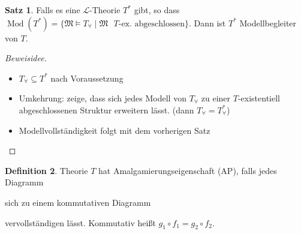 \documentclass[12pt,parskip=full]{scrartcl}
\theoremstyle{definition}
\newtheorem{theorem}{Satz}[section]
\newtheorem{definition}[theorem]{Definition}
\begin{document}
 	\begin{theorem}
 		Falls es eine $\mathcal{L}$-Theorie $T^*$ gibt, so dass $\operatorname{Mod}(T^*) = \{ \mathfrak{M} \models T_\forall \mid \mathfrak{M} \text{ $T$-ex. abgeschlossen} \}$. Dann ist $T^*$ Modellbegleiter von $T$.
 	\end{theorem}
 
 	\begin{proof}[Beweisidee]
 		\begin{itemize}
 			\item $T_\forall \subseteq T^*$ nach Voraussetzung
 			\item Umkehrung: zeige, dass sich jedes Modell von $T_\forall$ zu einer $T$-existentiell abgeschlossenen Struktur erweitern lässt. (dann $T_\forall = T_\forall^*$)
 			\item Modellvollständigkeit folgt mit dem vorherigen Satz
 		\end{itemize}
 	\end{proof}
 
 	\begin{definition}
 		Theorie $T$ hat Amalgamierungseigenschaft (AP), falls jedes Diagramm
 		
 		\begin{center}
 		\end{center}
 	
		sich zu einem kommutativen Diagramm
		
		\begin{center}
		\end{center}
	
		vervollständigen lässt. Kommutativ heißt $g_1 \circ f_1 = g_2 \circ f_2$.
 	\end{definition}
 
\end{document}
